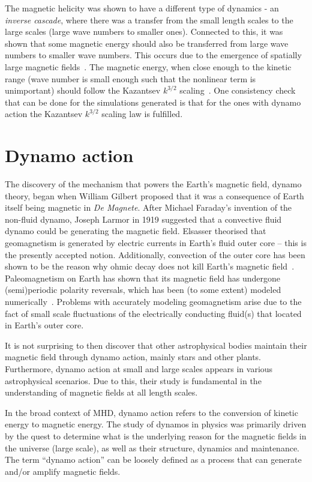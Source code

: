 \documentclass[12pt,a4paper]{report}
\begin{document}
The magnetic helicity was shown to have a different type of dynamics - an \textit{inverse cascade}, where there was a transfer from the small length scales to the large scales (large wave numbers to smaller ones). Connected to this, it was shown that some magnetic energy should also be transferred from large wave numbers to smaller wave numbers. This occurs due to the emergence of spatially large magnetic fields~\cite{LinkmannMoritzFrederikLeon2016Spim}. The magnetic energy, when close enough to the kinetic range (wave number is small enough such that the nonlinear term is unimportant) should follow the Kazantsev $k^{3/2}$ scaling~\cite{kazantsev1968enhancement, haugen2004simulations}. One consistency check that can be done for the simulations generated is that for the ones with dynamo action the Kazantsev $k^{3/2}$ scaling law is fulfilled.

\section{Dynamo action}
\label{sec3.3}

The discovery of the mechanism that powers the Earth's magnetic field, dynamo theory, began when William Gilbert proposed that it was a consequence of Earth itself being magnetic in \textit{De Magnete}. After Michael Faraday's invention of the non-fluid dynamo, Joseph Larmor in 1919 suggested that a convective fluid dynamo could be generating the magnetic field. Elsasser theorised that geomagnetism is generated by electric currents in Earth's fluid outer core -- this is the presently accepted notion. Additionally, convection of the outer core has been shown to be the reason why ohmic decay does not kill Earth's magnetic field~\cite{stern2002millennium}. Paleomagnetism on Earth has shown that its magnetic field has undergone (semi)periodic polarity reversals, which has been (to some extent) modeled numerically~\cite{glatzmaier1995three}. Problems with accurately modeling geomagnetism arise due to the fact of small scale fluctuations of the electrically conducting fluid(s) that located in Earth's outer core.

It is not surprising to then discover that other astrophysical bodies maintain their magnetic field through dynamo action, mainly stars and other plants. Furthermore, dynamo action at small and large scales appears in various astrophysical scenarios. Due to this, their study is fundamental in the understanding of magnetic fields at all length scales.

In the broad context of MHD, dynamo action refers to the conversion of kinetic energy to magnetic energy. The study of dynamos in physics was primarily driven by the quest to determine what is the underlying reason for the magnetic fields in the universe (large scale), as well as their structure, dynamics and maintenance. The term ``dynamo action'' can be loosely defined as a process that can generate and/or amplify magnetic fields. 
\end{document}
